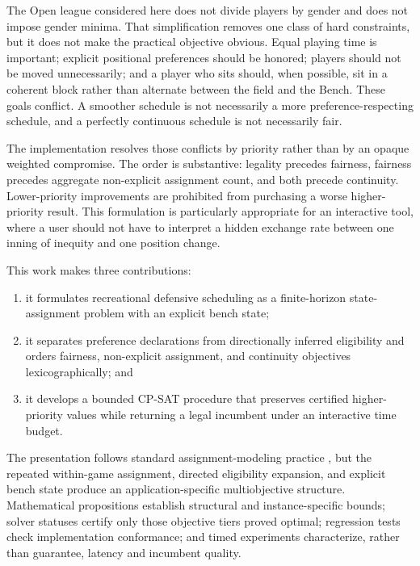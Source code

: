 \documentclass[11pt]{article}
\begin{document}
The Open league considered here does not divide players by gender and does
not impose gender minima. That simplification removes one class of hard
constraints, but it does not make the practical objective obvious. Equal
playing time is important; explicit positional preferences should be honored;
players should not be moved unnecessarily; and a player who sits should, when
possible, sit in a coherent block rather than alternate between the field and
the Bench. These goals conflict. A smoother schedule is not necessarily a
more preference-respecting schedule, and a perfectly continuous schedule is
not necessarily fair.

The implementation resolves those conflicts by priority rather than by an
opaque weighted compromise. The order is substantive: legality precedes
fairness, fairness precedes aggregate non-explicit assignment count, and both
precede continuity. Lower-priority improvements are prohibited from purchasing
a worse higher-priority result. This formulation is particularly appropriate
for an interactive tool, where a user should not have to interpret a hidden
exchange rate between one inning of inequity and one position change.

This work makes three contributions:
\begin{enumerate}
    \item it formulates recreational defensive scheduling as a finite-horizon
    state-assignment problem with an explicit bench state;
    \item it separates preference declarations from directionally inferred
    eligibility and orders fairness, non-explicit assignment, and continuity
    objectives lexicographically; and
    \item it develops a bounded CP-SAT procedure that preserves certified
    higher-priority values while returning a legal incumbent under an
    interactive time budget.
\end{enumerate}

The presentation follows standard assignment-modeling practice
\cite{bertsimas,williams}, but the repeated within-game assignment, directed
eligibility expansion, and explicit bench state produce an application-specific
multiobjective structure. Mathematical propositions establish structural and
instance-specific bounds; solver statuses certify only those objective tiers
proved optimal; regression tests check implementation conformance; and timed
experiments characterize, rather than guarantee, latency and incumbent quality.
\end{document}
